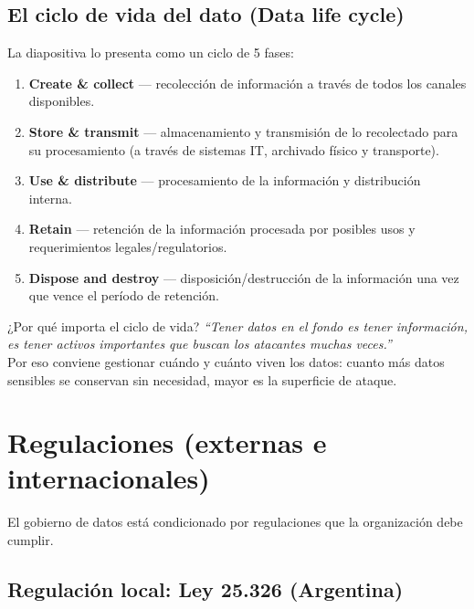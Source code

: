 \documentclass[11pt,a4paper]{article}
\newcommand{\prof}[1]{%
  \medskip\noindent\hspace*{1em}\textit{``#1''}\\[-1pt]%
  \hspace*{1em}{\footnotesize\textcolor{black!55}{--- Prof.\ Leandro Suárez (clase teórica)}}\medskip}
\begin{document}
\subsection{El ciclo de vida del dato (Data life cycle)}

La diapositiva lo presenta como un ciclo de 5 fases:

\begin{enumerate}[leftmargin=1.8em,itemsep=2pt]
  \item \textbf{Create \& collect} — recolección de información a través de todos los
        canales disponibles.
  \item \textbf{Store \& transmit} — almacenamiento y transmisión de lo recolectado para su
        procesamiento (a través de sistemas IT, archivado físico y transporte).
  \item \textbf{Use \& distribute} — procesamiento de la información y distribución interna.
  \item \textbf{Retain} — retención de la información procesada por posibles usos y
        requerimientos legales/regulatorios.
  \item \textbf{Dispose and destroy} — disposición/destrucción de la información una vez que
        vence el período de retención.
\end{enumerate}

\begin{notebox}{¿Por qué importa el ciclo de vida?}
\prof{Tener datos en el fondo es tener información, es tener activos importantes que buscan
los atacantes muchas veces.} Por eso conviene gestionar cuándo y cuánto viven los datos:
cuanto más datos sensibles se conservan sin necesidad, mayor es la superficie de ataque.
\end{notebox}

\section{Regulaciones (externas e internacionales)}

El gobierno de datos está condicionado por regulaciones que la organización debe cumplir.

\subsection{Regulación local: Ley 25.326 (Argentina)}
\end{document}
